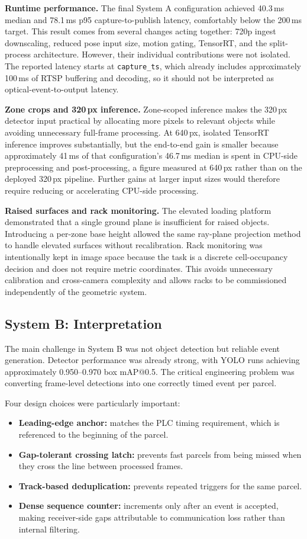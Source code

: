 \documentclass[9pt,a4paper,twocolumn]{rho-class/rho}
\begin{document}
\textbf{Runtime performance.} The final System A configuration achieved 40.3\,ms median and 78.1\,ms p95 capture-to-publish latency, comfortably below the 200\,ms target. This result comes from several changes acting together: 720p ingest downscaling, reduced pose input size, motion gating, TensorRT, and the split-process architecture. However, their individual contributions were not isolated. The reported latency starts at \texttt{capture\_ts}, which already includes approximately 100\,ms of RTSP buffering and decoding, so it should not be interpreted as optical-event-to-output latency.

\textbf{Zone crops and 320\,px inference.} Zone-scoped inference makes the 320\,px detector input practical by allocating more pixels to relevant objects while avoiding unnecessary full-frame processing. At 640\,px, isolated TensorRT inference improves substantially, but the end-to-end gain is smaller because approximately 41\,ms of that configuration's 46.7\,ms median is spent in CPU-side preprocessing and post-processing, a figure measured at 640\,px rather than on the deployed 320\,px pipeline. Further gains at larger input sizes would therefore require reducing or accelerating CPU-side processing.

\textbf{Raised surfaces and rack monitoring.} The elevated loading platform demonstrated that a single ground plane is insufficient for raised objects. Introducing a per-zone base height allowed the same ray-plane projection method to handle elevated surfaces without recalibration. Rack monitoring was intentionally kept in image space because the task is a discrete cell-occupancy decision and does not require metric coordinates. This avoids unnecessary calibration and cross-camera complexity and allows racks to be commissioned independently of the geometric system.

\subsection{System B: Interpretation}

The main challenge in System B was not object detection but reliable event generation. Detector performance was already strong, with YOLO runs achieving approximately 0.950--0.970 box mAP@0.5. The critical engineering problem was converting frame-level detections into one correctly timed event per parcel.

Four design choices were particularly important:
\begin{itemize}
    \item \textbf{Leading-edge anchor:} matches the PLC timing requirement, which is referenced to the beginning of the parcel.
    \item \textbf{Gap-tolerant crossing latch:} prevents fast parcels from being missed when they cross the line between processed frames.
    \item \textbf{Track-based deduplication:} prevents repeated triggers for the same parcel.
    \item \textbf{Dense sequence counter:} increments only after an event is accepted, making receiver-side gaps attributable to communication loss rather than internal filtering.
\end{itemize}
\end{document}
